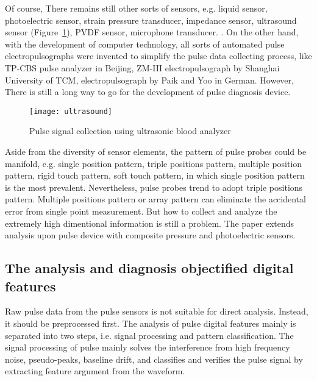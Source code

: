 Of course, There remains still other sorts of sensors, e.g. liquid sensor,
photoelectric sensor, strain pressure transducer, impedance sensor,
ultrasound sensor (Figure~\ref{fig:ultrasound}), PVDF sensor,
microphone transducer\cite{laub1983new}.
. On the other hand, with the development of computer
technology, all sorts of automated pulse electropulsographs were invented
to simplify the pulse data collecting process, like TP-CBS pulse
analyzer in Beijing, ZM-III electropulsograph by Shanghai University of
TCM, electropulsograph by Paik and Yoo in German. However, There is still a
long way to go for the development of pulse diagnosis device. 
\begin{figure}[htbp]
    \begin{center}
        \texttt{[image: ultrasound]}
    \end{center}
    \caption{Pulse signal collection using ultrasonic blood analyzer}
    \label{fig:ultrasound}
\end{figure}
Aside from the diversity of sensor elements, the pattern of pulse
probes could be manifold, e.g. single position pattern, triple
positions pattern, multiple position pattern, rigid touch pattern,
soft touch pattern, in which single position pattern is the most
prevalent. Nevertheless, pulse probes trend to adopt triple positions
pattern. Multiple positions pattern or array pattern can eliminate the
accidental error from single point measurement. But how to collect and
analyze the extremely high dimentional information is still a problem.
The paper extends analysis upon pulse device with composite pressure and photoelectric
sensors. 

\subsection{The analysis and diagnosis objectified digital features}
Raw pulse data from the pulse sensors is not suitable for direct
analysis. Instead, it should be preprocessed first. The analysis of
pulse digital features mainly is separated into two steps, i.e. signal
processing and pattern classification. The signal
processing of pulse mainly solves the interference from high frequency
noise, pseudo-peaks, baseline drift, and classifies and verifies the
pulse signal by extracting feature argument from the waveform. 

